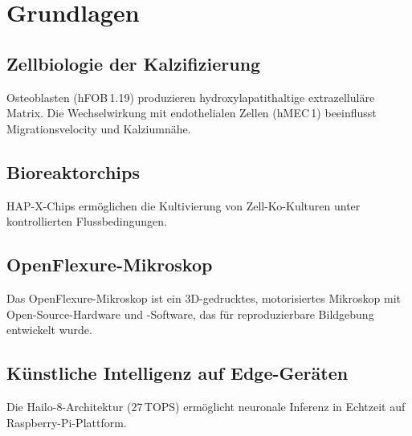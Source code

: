 \chapter{Grundlagen}
\label{chap:grundlagen}

\section{Zellbiologie der Kalzifizierung}

Osteoblasten (hFOB\,1.19) produzieren hydroxylapatithaltige extrazelluläre
Matrix. Die Wechselwirkung mit endothelialen Zellen (hMEC\,1) beeinflusst
Migrationsvelocity und Kalziumnähe.

\section{Bioreaktorchips}

HAP-X-Chips ermöglichen die Kultivierung von Zell-Ko-Kulturen unter kontrollierten
Flussbedingungen.

\section{OpenFlexure-Mikroskop}

Das OpenFlexure-Mikroskop ist ein 3D-gedrucktes, motorisiertes Mikroskop mit
Open-Source-Hardware und -Software, das für reproduzierbare Bildgebung entwickelt
wurde.

\section{Künstliche Intelligenz auf Edge-Geräten}

Die Hailo-8-Architektur (27\,TOPS) ermöglicht neuronale Inferenz in Echtzeit auf
Raspberry-Pi-Plattform.